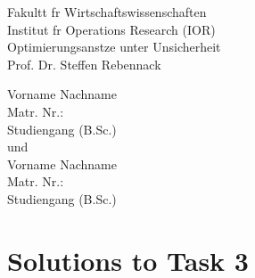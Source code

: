 \documentclass[a4paper,12pt]{article}
\begin{document}
\begin{titlepage}
    \begin{center}
        \vspace*{-80pt}

        \vspace*{40pt}

        Fakultt fr Wirtschaftswissenschaften \\[1ex]
        Institut fr Operations Research (IOR) \\[1ex]
        Optimierungsanstze unter Unsicherheit \\[1ex]
        Prof. Dr. Steffen Rebennack          

        \vspace*{25pt}   

        \vspace*{35pt}

        \fboxsep 40pt
        \fboxrule 6pt

        \vspace*{40pt}

        \normalsize

        Vorname Nachname\\
        Matr. Nr.:\\
        Studiengang (B.Sc.)\\[4ex]

        und \\[4ex]

        Vorname Nachname\\
        Matr. Nr.:\\
        Studiengang (B.Sc.)\\[4ex]
    \end{center}
\end{titlepage}

\newpage

\section*{Solutions to Task 3}
\end{document}
